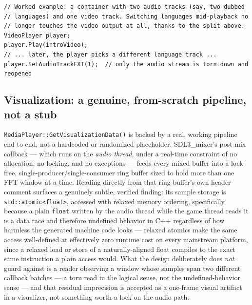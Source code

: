 \begin{lstlisting}
// Worked example: a container with two audio tracks (say, two dubbed
// languages) and one video track. Switching languages mid-playback no
// longer touches the video output at all, thanks to the split above.
VideoPlayer player;
player.Play(introVideo);
// ... later, the player picks a different language track ...
player.SetAudioTrackEXT(1);  // only the audio stream is torn down and reopened
\end{lstlisting}

\subsection{Visualization: a genuine, from-scratch pipeline, not a stub}

\texttt{MediaPlayer::GetVisualizationData()} is backed by a real, working pipeline end to end,
not a hardcoded or randomized placeholder. SDL3\_mixer's post-mix callback --- which runs on
the \emph{audio thread}, under a real-time constraint of no allocation, no locking, and no
exceptions --- feeds every mixed buffer into a lock-free, single-producer/single-consumer ring
buffer sized to hold more than one FFT window at a time. Reading directly from that ring
buffer's own header comment surfaces a genuinely subtle, verified finding: its sample storage
is \texttt{std::atomic<float>}, accessed with relaxed memory ordering, specifically because a
plain \texttt{float} written by the audio thread while the game thread reads it is a data race
and therefore undefined behavior in C++ regardless of how harmless the generated machine code
looks --- relaxed atomics make the same access well-defined at effectively zero runtime cost on
every mainstream platform, since a relaxed load or store of a naturally-aligned float compiles
to the exact same instruction a plain access would. What the design deliberately does
\emph{not} guard against is a reader observing a window whose samples span two different
callback batches --- a torn read in the logical sense, not the undefined-behavior sense --- and
that residual imprecision is accepted as a one-frame visual artifact in a visualizer, not
something worth a lock on the audio path.

